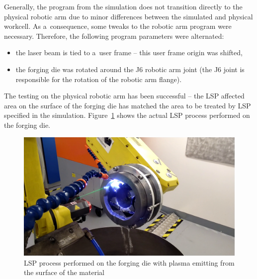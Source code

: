 Generally, the program from the simulation does not transition directly to the physical robotic arm due to minor differences between the simulated and physical workcell.  As a~consequence, some tweaks to the robotic arm program were necessary. Therefore, the following program parameters were alternated:

\begin{itemize}

\item the laser beam is tied to a~user frame -- this user frame origin was shifted,

\item the forging die was rotated around the J6 robotic arm joint (the J6 joint is responsible for the rotation of the robotic arm flange).
 
\end{itemize}
The testing on the physical robotic arm has been successful -- the LSP affected area on the surface of the forging die has matched the area to be treated by LSP specified in the simulation. Figure~\ref{fig:peening} shows the actual LSP process performed on the forging die. 

\begin{figure}[h]
    \centering
    \includegraphics[width=0.9\linewidth]{img/peening_v2.png}
    \caption[LSP process performed on the forging die]{LSP process performed on the forging die with plasma emitting from the surface of the material}
    \label{fig:peening}
\end{figure}



